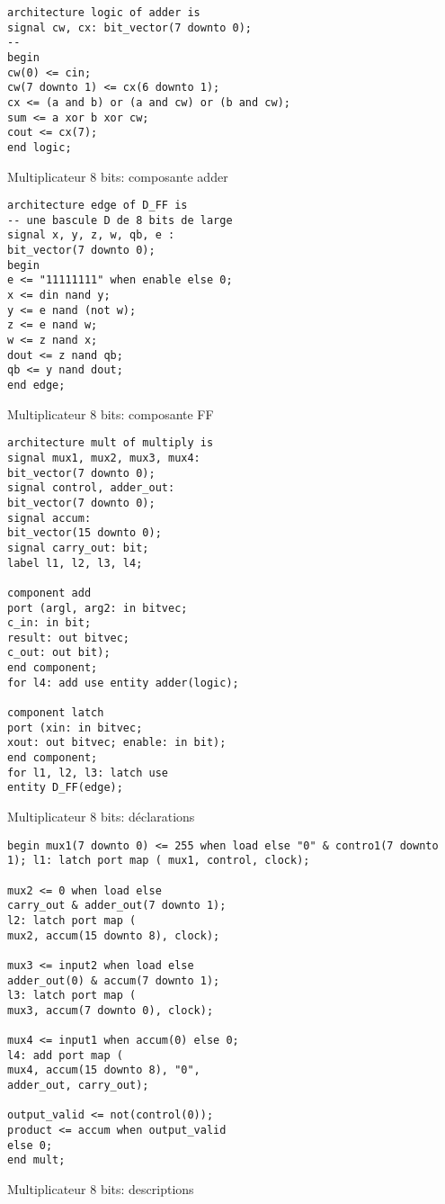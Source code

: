 \documentclass[11pt]{article}
\begin{document}
\begin{listing}[htbp]
\begin{verbatim}
architecture logic of adder is
signal cw, cx: bit_vector(7 downto 0);
--
begin
cw(0) <= cin;
cw(7 downto 1) <= cx(6 downto 1);
cx <= (a and b) or (a and cw) or (b and cw);
sum <= a xor b xor cw;
cout <= cx(7);
end logic;
\end{verbatim}
\caption{Multiplicateur 8 bits: composante adder}
\end{listing}

\begin{listing}[htbp]
\begin{verbatim}
architecture edge of D_FF is
-- une bascule D de 8 bits de large
signal x, y, z, w, qb, e :
bit_vector(7 downto 0);
begin
e <= "11111111" when enable else 0;
x <= din nand y;
y <= e nand (not w);
z <= e nand w;
w <= z nand x;
dout <= z nand qb;
qb <= y nand dout;
end edge;
\end{verbatim}
\caption{Multiplicateur 8 bits: composante FF}
\end{listing}


\begin{listing}[htbp]
\begin{verbatim}
architecture mult of multiply is
signal mux1, mux2, mux3, mux4:
bit_vector(7 downto 0);
signal control, adder_out:
bit_vector(7 downto 0);
signal accum:
bit_vector(15 downto 0);
signal carry_out: bit;
label l1, l2, l3, l4;

component add
port (argl, arg2: in bitvec;
c_in: in bit;
result: out bitvec;
c_out: out bit);
end component;
for l4: add use entity adder(logic);

component latch
port (xin: in bitvec;
xout: out bitvec; enable: in bit);
end component;
for l1, l2, l3: latch use
entity D_FF(edge);
\end{verbatim}
\caption{Multiplicateur 8 bits: déclarations}
\end{listing}


\begin{listing}[htbp]
\begin{verbatim}
begin mux1(7 downto 0) <= 255 when load else "0" & contro1(7 downto
1); l1: latch port map ( mux1, control, clock);

mux2 <= 0 when load else
carry_out & adder_out(7 downto 1);
l2: latch port map (
mux2, accum(15 downto 8), clock);

mux3 <= input2 when load else
adder_out(0) & accum(7 downto 1);
l3: latch port map (
mux3, accum(7 downto 0), clock);

mux4 <= input1 when accum(0) else 0;
l4: add port map (
mux4, accum(15 downto 8), "0",
adder_out, carry_out);

output_valid <= not(control(0));
product <= accum when output_valid
else 0;
end mult;
\end{verbatim}
\caption{Multiplicateur 8 bits: descriptions}
\end{listing}
\end{document}
